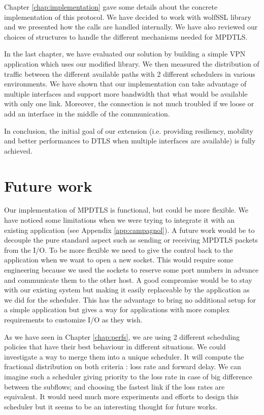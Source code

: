 Chapter \ref{chap:implementation} gave some details about the concrete implementation of this protocol. We have decided to work with wolfSSL library and we presented how the calls are handled internally. We have also reviewed our choices of structures to handle the different mechanisms needed for MPDTLS.

In the last chapter, we have evaluated our solution by building a simple VPN application which uses our modified library. We then measured the distribution of traffic between the different available paths with 2 different schedulers in various environments. We have shown that our implementation can take advantage of multiple interfaces and support more bandwidth that what would be available with only one link. Moreover, the connection is not much troubled if we loose or add an interface in the middle of the communication.

In conclusion, the initial goal of our extension (i.e. providing resiliency, mobility and better performances to DTLS when multiple interfaces are available) is fully achieved.


\section{Future work}

Our implementation of MPDTLS is functional, but could be more flexible. We have noticed some limitations when we were trying to integrate it with an existing application (see Appendix \ref{app:campagnol}). A future work would be to decouple the pure standard aspect such as sending or receiving MPDTLS packets from the I/O. To be more flexible we need to give the control back to the application when we want to open a new socket. This would require some engineering because we used the sockets to reserve some port numbers in advance and communicate them to the other host. A good compromise would be to stay with our existing system but making it easily replaceable by the application as we did for the scheduler. This has the advantage to bring no additional setup for a simple application but gives a way for applications with more complex requirements to customize I/O as they wish.

As we have seen in Chapter \ref{chap:perfs}, we are using 2 different scheduling policies that have their best behaviour in different situations. We could investigate a way to merge them into a unique scheduler. It will compute the fractional distribution on both criteria : loss rate and forward delay. We can imagine such a scheduler giving priority to the loss rate in case of big difference between the subflows; and choosing the fastest link if the loss rates are equivalent. It would need much more experiments and efforts to design this scheduler but it seems to be an interesting thought for future works.

